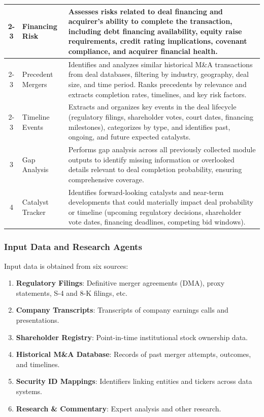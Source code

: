 \documentclass{article}
\theoremstyle{plain}
\theoremstyle{definition}
\theoremstyle{remark}
\begin{document}
\begin{table}[t]
\begin{tabularx}{\textwidth}{@{}c l X@{}}
    \cmidrule(lr){2-3}
     & Financing Risk & Assesses risks related to deal financing and acquirer's ability to complete the transaction, including debt financing availability, equity raise requirements, credit rating implications, covenant compliance, and acquirer financial health. \\
    \cmidrule(lr){2-3}
     & Precedent Mergers & Identifies and analyzes similar historical M\&A transactions from deal databases, filtering by industry, geography, deal size, and time period. Ranks precedents by relevance and extracts completion rates, timelines, and key risk factors. \\
    \cmidrule(lr){2-3}
     & Timeline Events & Extracts and organizes key events in the deal lifecycle (regulatory filings, shareholder votes, court dates, financing milestones), categorizes by type, and identifies past, ongoing, and future expected catalysts. \\
    \midrule
    3 & Gap Analysis & Performs gap analysis across all previously collected module outputs to identify missing information or overlooked details relevant to deal completion probability, ensuring comprehensive coverage. \\
    \midrule
    4 & Catalyst Tracker & Identifies forward-looking catalysts and near-term developments that could materially impact deal probability or timeline (upcoming regulatory decisions, shareholder vote dates, financing deadlines, competing bid windows). \\
    \bottomrule
  \end{tabularx}
\end{table}

\subsubsection{Input Data and Research Agents}
\label{sec:input-data}

Input data is obtained from six sources:
\begin{enumerate}
    \item \textbf{Regulatory Filings}: Definitive merger agreements (DMA), proxy statements, S-4 and 8-K filings, etc.
    \item \textbf{Company Transcripts}: Transcripts of company earnings calls and presentations.
    \item \textbf{Shareholder Registry}: Point-in-time institutional stock ownership data.
    \item \textbf{Historical M\&A Database}: Records of past merger attempts, outcomes, and timelines.
    \item \textbf{Security ID Mappings}: Identifiers linking entities and tickers across data systems.
    \item \textbf{Research \& Commentary}: Expert analysis and other research.
\end{enumerate}
\end{document}
